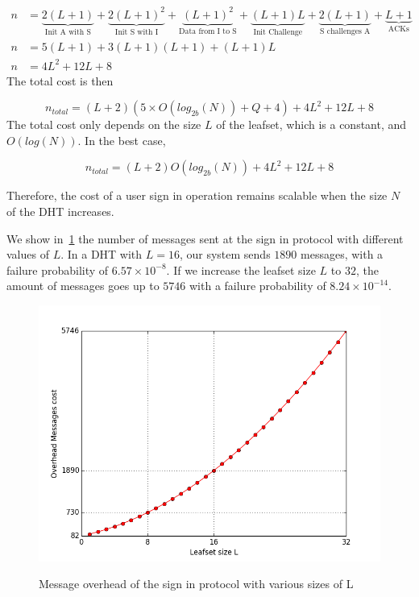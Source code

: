     \begin{align}
      n &= \underbrace{2(L+1)}_\text{Init A with S} +
           \underbrace{2(L+1)^2}_\text{Init S with I} +
           \underbrace{(L+1)^2}_\text{Data from I to S} +
           \underbrace{(L+1)L}_\text{Init Challenge} +
           \underbrace{2(L+1)}_\text{S challenges A} +
           \underbrace{L+1}_\text{ACKs}\\
      n &= 5(L+1) + 3(L+1)(L+1)+ (L+1)L\\
      n &= 4L^2 +12L + 8 
    \end{align}
     The total cost is then

    $$
      n_{total} = (L +2)(5 \times O(log_{2b}(N)) + Q + 4) + 4L^2 +12L + 8 
    $$    
    The total cost only depends on the size $L$ of the leafset, which is a
constant, and $O(log(N))$. In the best case, 

    $$
      n_{total} = (L +2)O(log_{2b}(N)) + 4L^2 +12L + 8 
    $$

    Therefore, the cost of a user sign in operation remains
scalable when the size $N$ of the DHT increases.

    We show in~\ref{fig:sign_in_messages} the number of messages sent at
the sign in protocol with different values of $L$. In a DHT with
$L = 16$, our system sends $1890$ messages, with a failure probability of
 $6.57 \times 10^{-8}$. If we increase the leafset size $L$ to $32$, the amount of
messages goes up to $5746$ with a failure probability of $8.24 \times 10^{-14}$.


\begin{figure}[!htb]
\centering
\includegraphics[width=14cm]{../plots/sign_in_messages}\\
\caption{Message overhead of the sign in protocol with various sizes of L}
\label{fig:sign_in_messages}
\end{figure}


